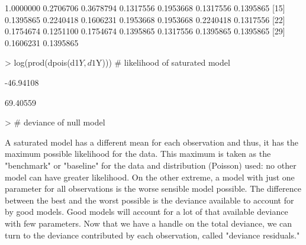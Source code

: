 \documentclass{article}
\begin{document}
\begin{Schunk}
\begin{Soutput}
 [8] 1.0000000 0.2706706 0.3678794 0.1317556 0.1953668 0.1317556 0.1395865
[15] 0.1395865 0.2240418 0.1606231 0.1953668 0.1953668 0.2240418 0.1317556
[22] 0.1754674 0.1251100 0.1754674 0.1395865 0.1317556 0.1395865 0.1395865
[29] 0.1606231 0.1395865
\end{Soutput}
\begin{Sinput}
> log(prod(dpois(d1$Y, d1$Y))) # likelihood of saturated model
\end{Sinput}
\begin{Soutput}
[1] -46.94108
\end{Soutput}
\begin{Soutput}
[1] 69.40559
\end{Soutput}
\begin{Sinput}
> # deviance of null model
\end{Sinput}
\end{Schunk}

A saturated model has a different mean for each observation and thus, it has the maximum possible likelihood for the data. This maximum is taken as the "benchmark" or "baseline" for the data and distribution (Poisson) used: no other model can have greater likelihood. On the other extreme, a model with just one parameter for all observations is the worse sensible model possible. The difference between the best and the worst possible is the deviance available to account for by good models. Good models will account for a lot of that available deviance with few parameters. Now that we have a handle on the total deviance, we can turn to the deviance contributed by each observation, called "deviance residuals."
\end{document}
